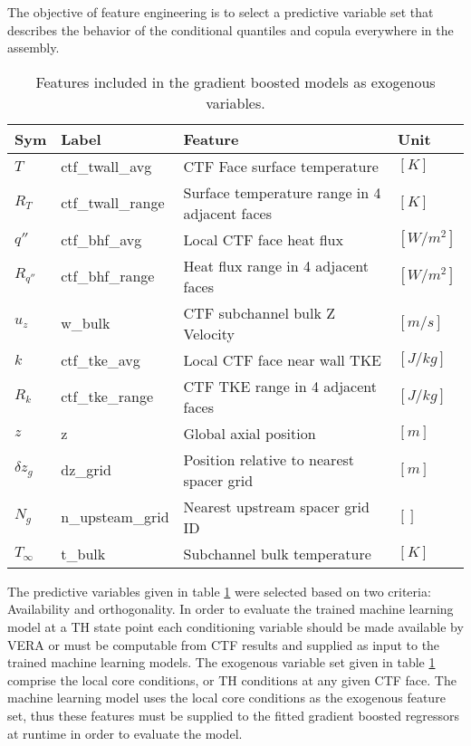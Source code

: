 The objective of feature engineering is to select a predictive variable set that describes the behavior of the conditional quantiles and copula everywhere in the assembly.

\begin{table}[h]
    \begin{center}
    \caption[Included exogenous training features.]{Features included in the gradient boosted models as exogenous variables.}
\begin{tabular}[h]{|l | l | l | l |}
    \hline
    Sym & Label & Feature & Unit \\
    \hline
    \hline
    $T$ & ctf\_twall\_avg & CTF Face surface temperature & $[K]$ \\
    $R_T$ & ctf\_twall\_range & Surface temperature range in 4 adjacent faces & $[K]$ \\
    $q''$ & ctf\_bhf\_avg & Local CTF face heat flux & $[W/m^2]$ \\
    $R_{q''}$ & ctf\_bhf\_range & Heat flux range in 4 adjacent faces & $[W/m^2]$ \\
    $u_z$ & w\_bulk & CTF subchannel bulk Z Velocity &  $[m/s]$ \\
    $k$ & ctf\_tke\_avg & Local CTF face near wall TKE &  $[J/kg]$ \\
    $R_k$ & ctf\_tke\_range & CTF TKE range in 4 adjacent faces & $[J/kg]$ \\
    $z$ & z & Global axial position & $[m]$ \\
    $\delta z_g$ & dz\_grid & Position relative to nearest spacer grid & $[m]$ \\
    $N_g$ & n\_upsteam\_grid  & Nearest upstream spacer grid ID & $[]$ \\
    $T_\infty$ & t\_bulk & Subchannel bulk temperature  &  $[K]$ \\
    \hline
\end{tabular}
\label{tab:features}
\end{center}
\end{table}

The predictive variables given in table \ref{tab:features} were selected based on two criteria:  Availability and orthogonality.  In order to evaluate the trained machine learning model at a TH state point each conditioning variable should be made available by VERA or must be computable from CTF results and supplied as input to the trained machine learning models.   The exogenous variable set given in table \ref{tab:features} comprise the local core conditions, or TH conditions at any given CTF face.  The machine learning model uses the local core conditions as the exogenous feature set, thus these features must be supplied to the fitted gradient boosted regressors at runtime in order to evaluate the model.

